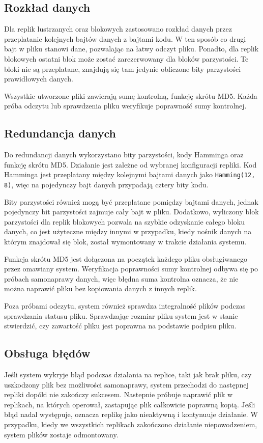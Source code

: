 \subsection {Rozkład danych}
Dla replik lustrzanych oraz blokowych zastosowano rozkład danych przez przeplatanie kolejnych bajtów danych z bajtami kodu. W ten sposób co drugi bajt w pliku stanowi dane, pozwalając na łatwy odczyt pliku. Ponadto, dla replik blokowych ostatni blok może zostać zarezerwowany dla bloków parzystości. Te bloki nie są przeplatane, znajdują się tam jedynie obliczone bity parzystości prawidłowych danych.

Wszystkie utworzone pliki zawierają sumę kontrolną, funkcję skrótu MD5. Każda próba odczytu lub sprawdzenia pliku weryfikuje poprawność sumy kontrolnej.

\subsection{Redundancja danych}
Do redundancji danych wykorzystano bity parzystości, kody Hamminga oraz funkcję skrótu MD5. Działanie jest zależne od wybranej konfiguracji repliki. Kod Hamminga jest przeplatany między kolejnymi bajtami danych jako \verb|Hamming(12, 8)|, więc na pojedynczy bajt danych przypadają cztery bity kodu. 

Bity parzystości również mogą być przeplatane pomiędzy bajtami danych, jednak pojedynczy bit parzystości zajmuje cały bajt w pliku. Dodatkowo, wyliczony blok parzystości dla replik blokowych pozwala na szybkie odzyskanie całego bloku danych, co jest użyteczne między innymi w przypadku, kiedy nośnik danych na którym znajdował się blok, został wymontowany w trakcie działania systemu. 

Funkcja skrótu MD5 jest dołączona na początek każdego pliku obsługiwanego przez omawiany system. Weryfikacja poprawności sumy kontrolnej odbywa się po próbach samonaprawy danych, więc błędna suma kontrolna oznacza, że nie można naprawić pliku bez kopiowania danych z innych replik.

Poza próbami odczytu, system również sprawdza integralność plików podczas sprawdzania statusu pliku. Sprawdzając rozmiar pliku system jest w stanie stwierdzić, czy zawartość pliku jest poprawna na podstawie podpisu pliku. 

\subsection{Obsługa błędów}
Jeśli system wykryje błąd podczas działania na replice, taki jak brak pliku, czy uszkodzony plik bez możliwości samonaprawy, system przechodzi do następnej repliki dopóki nie zakończy sukcesem. Nastepnie próbuje naprawić plik w replikach, na których operował, zastapując plik całkowicie poprawną kopią. Jeśli błąd nadal występuje, oznacza replikę jako nieaktywną i kontynuuje działanie. W przypadku, kiedy we wszystkich replikach zakończono działanie niepowodzeniem, system plików zostaje odmontowany.
